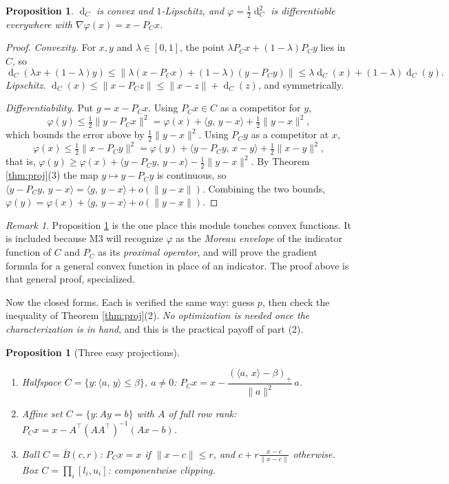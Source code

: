 \documentclass[11pt,a4paper]{article}
\theoremstyle{definition}
\theoremstyle{plain}
\newtheorem{proposition}[theorem]{Proposition}
\theoremstyle{remark}
\newtheorem*{remark}{Remark}
\newcommand{\ip}[2]{\langle #1,\, #2\rangle}
\newcommand{\norm}[1]{\lVert #1\rVert}
\newcommand{\proj}{P}
\DeclareMathOperator{\dist}{d}
\begin{document}
\begin{proposition}
\label{prop:dist}
$\dist_C$ is convex and $1$-Lipschitz, and $\varphi=\tfrac12\dist_C^2$ is differentiable
everywhere with $\nabla\varphi(x)=x-\proj_Cx$.
\end{proposition}

\begin{proof}
\emph{Convexity.} For $x,y$ and $\lambda\in[0,1]$, the point
$\lambda\proj_Cx+(1-\lambda)\proj_Cy$ lies in $C$, so
\[
\dist_C(\lambda x+(1-\lambda)y)\le\norm{\lambda(x-\proj_Cx)+(1-\lambda)(y-\proj_Cy)}
\le\lambda\dist_C(x)+(1-\lambda)\dist_C(y).
\]
\emph{Lipschitz.} $\dist_C(x)\le\norm{x-\proj_Cz}\le\norm{x-z}+\dist_C(z)$, and symmetrically.

\emph{Differentiability.} Put $g=x-\proj_Cx$. Using $\proj_Cx\in C$ as a competitor for $y$,
\[
\varphi(y)\le\tfrac12\norm{y-\proj_Cx}^2=\varphi(x)+\ip{g}{y-x}+\tfrac12\norm{y-x}^2 ,
\]
which bounds the error above by $\tfrac12\norm{y-x}^2$. Using $\proj_Cy$ as a competitor at $x$,
\[
\varphi(x)\le\tfrac12\norm{x-\proj_Cy}^2=\varphi(y)+\ip{y-\proj_Cy}{x-y}+\tfrac12\norm{x-y}^2 ,
\]
that is, $\varphi(y)\ge\varphi(x)+\ip{y-\proj_Cy}{y-x}-\tfrac12\norm{y-x}^2$. By Theorem
\ref{thm:proj}(3) the map $y\mapsto y-\proj_Cy$ is continuous, so
$\ip{y-\proj_Cy}{y-x}=\ip{g}{y-x}+o(\norm{y-x})$. Combining the two bounds,
$\varphi(y)=\varphi(x)+\ip{g}{y-x}+o(\norm{y-x})$.
\end{proof}

\begin{remark}
Proposition \ref{prop:dist} is the one place this module touches convex functions. It is
included because M3 will recognize $\varphi$ as the \emph{Moreau envelope} of the indicator
function of $C$ and $\proj_C$ as its \emph{proximal operator}, and will prove the gradient
formula for a general convex function in place of an indicator. The proof above is that general
proof, specialized.
\end{remark}

Now the closed forms. Each is verified the same way: guess $p$, then check the inequality of
Theorem \ref{thm:proj}(2). \emph{No optimization is needed once the characterization is in
hand}, and this is the practical payoff of part (2).

\begin{proposition}[Three easy projections]
\label{prop:easyproj}
\begin{enumerate}
\item Halfspace $C=\{y:\ip{a}{y}\le\beta\}$, $a\ne0$:
$\proj_Cx=x-\dfrac{(\ip{a}{x}-\beta)_+}{\norm a^2}\,a$.
\item Affine set $C=\{y:Ay=b\}$ with $A$ of full row rank:
$\proj_Cx=x-A^\top(AA^\top)^{-1}(Ax-b)$.
\item Ball $C=\bar B(c,r)$: $\proj_Cx=x$ if $\norm{x-c}\le r$, and
$c+r\frac{x-c}{\norm{x-c}}$ otherwise. Box $C=\prod_i[l_i,u_i]$: componentwise clipping.
\end{enumerate}
\end{proposition}
\end{document}
